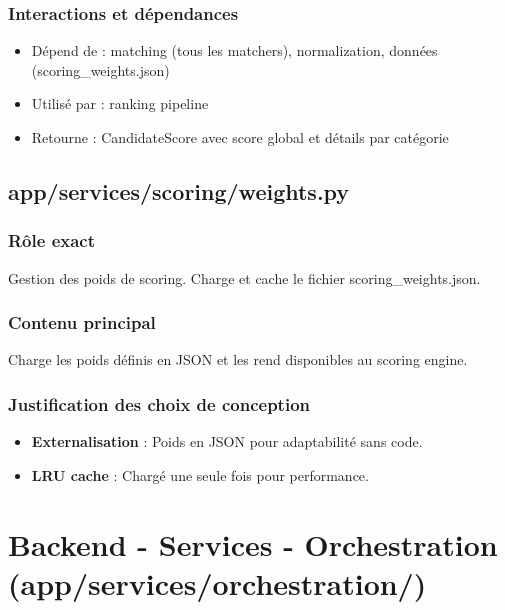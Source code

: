\documentclass[12pt,a4paper,oneside]{book}
\begin{document}
\subsubsection{Interactions et dépendances}

\begin{itemize}
    \item Dépend de : matching (tous les matchers), normalization, données (scoring\_weights.json)
    \item Utilisé par : ranking pipeline
    \item Retourne : CandidateScore avec score global et détails par catégorie
\end{itemize}

\subsection{app/services/scoring/weights.py}

\subsubsection{Rôle exact}

Gestion des poids de scoring. Charge et cache le fichier scoring\_weights.json.

\subsubsection{Contenu principal}

Charge les poids définis en JSON et les rend disponibles au scoring engine.

\subsubsection{Justification des choix de conception}

\begin{itemize}
    \item \textbf{Externalisation} : Poids en JSON pour adaptabilité sans code.
    
    \item \textbf{LRU cache} : Chargé une seule fois pour performance.
\end{itemize}

\newpage

\section{Backend - Services - Orchestration (app/services/orchestration/)}
\end{document}
